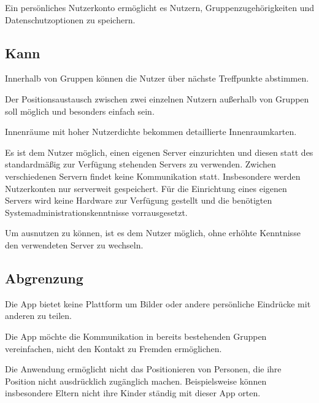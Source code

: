\documentclass[parskip=full,11pt]{scrartcl}
\begin{document}
Ein persönliches Nutzerkonto ermöglicht es Nutzern,
Gruppenzugehörigkeiten und Datenschutzoptionen zu speichern.

\subsection{Kann}
Innerhalb von Gruppen können die Nutzer über nächste Treffpunkte abstimmen.

Der Positionsaustausch zwischen zwei einzelnen Nutzern außerhalb von Gruppen
soll möglich und besonders einfach sein.

Innenräume mit hoher Nutzerdichte bekommen detaillierte Innenraumkarten.

Es ist dem Nutzer möglich, einen eigenen Server einzurichten und diesen statt
des standardmäßig zur Verfügung stehenden Servers zu verwenden.
Zwichen verschiedenen Servern findet keine Kommunikation statt.
Insbesondere werden Nutzerkonten nur serverweit gespeichert.
Für die Einrichtung eines eigenen Servers wird keine Hardware zur Verfügung
gestellt und die benötigten Systemadministrationskenntnisse vorrausgesetzt.

Um  ausnutzen zu können, ist es dem Nutzer
möglich, ohne erhöhte Kenntnisse den verwendeten Server zu wechseln.

\subsection{Abgrenzung}
Die App bietet keine Plattform um Bilder oder andere persönliche Eindrücke mit
anderen zu teilen.

Die App möchte die Kommunikation in bereits bestehenden Gruppen vereinfachen,
nicht den Kontakt zu Fremden ermöglichen.

Die Anwendung ermöglicht nicht das Positionieren von Personen,
die ihre Position nicht ausdrücklich zugänglich machen.
Beispielsweise können insbesondere Eltern nicht ihre Kinder ständig mit dieser
App orten.
\end{document}
